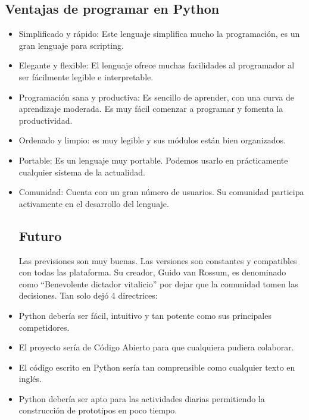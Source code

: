 	
\subsection{Ventajas de programar en Python}
\begin{itemize}	
\item	Simplificado y rápido: Este lenguaje simplifica mucho la programación, es un gran lenguaje para scripting.\\
\item	Elegante y flexible: El lenguaje ofrece muchas facilidades al programador al ser fácilmente legible e interpretable.\\
\item	Programación sana y productiva: Es sencillo de aprender, con una curva de aprendizaje moderada. Es muy fácil comenzar a programar y fomenta la productividad.\\
\item	Ordenado y limpio: es muy legible y sus módulos están bien organizados.\\
\item	Portable: Es un lenguaje muy portable. Podemos usarlo en prácticamente cualquier sistema de la actualidad.\\
\item	Comunidad: Cuenta con un gran número de usuarios. Su comunidad participa activamente en el desarrollo del lenguaje.\\


	

\subsection{Futuro}

Las previsiones son muy buenas. Las versiones son constantes y compatibles con todas las plataforma. Su creador, Guido van Rossum, es denominado como “Benevolente dictador vitalicio” por dejar que la comunidad tomen las decisiones. Tan solo dejó 4 directrices:
\item	Python debería ser fácil, intuitivo y tan potente como sus principales competidores.
\item	El proyecto sería de Código Abierto para que cualquiera pudiera colaborar.
\item	El código escrito en Python sería tan comprensible como cualquier texto en inglés.
\item	Python debería ser apto para las actividades diarias permitiendo la construcción de prototipos en poco tiempo.

\end{itemize}

	